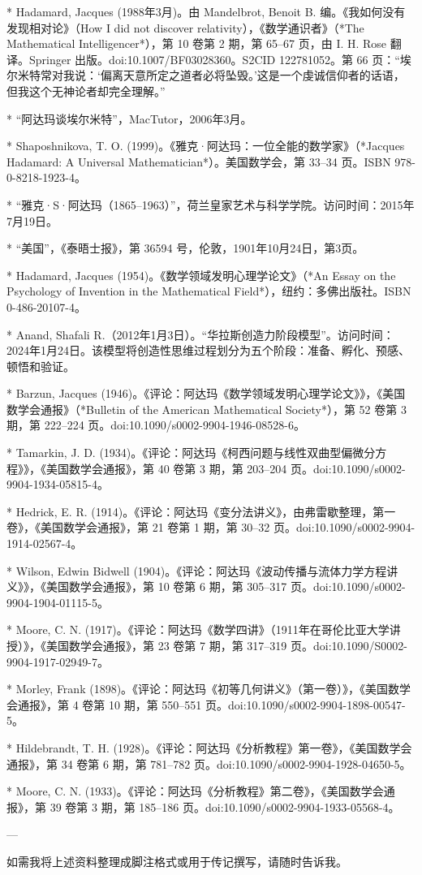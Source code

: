 * Hadamard, Jacques (1988年3月)。由 Mandelbrot, Benoit B. 编。《我如何没有发现相对论》（How I did not discover relativity），《数学通识者》（*The Mathematical Intelligencer*），第 10 卷第 2 期，第 65–67 页，由 I. H. Rose 翻译。Springer 出版。doi:10.1007/BF03028360。S2CID 122781052。第 66 页：“埃尔米特常对我说：‘偏离天意所定之道者必将坠毁。’这是一个虔诚信仰者的话语，但我这个无神论者却完全理解。”

* “阿达玛谈埃尔米特”，MacTutor，2006年3月。

* Shaposhnikova, T. O. (1999)。《雅克·阿达玛：一位全能的数学家》（*Jacques Hadamard: A Universal Mathematician*）。美国数学会，第 33–34 页。ISBN 978-0-8218-1923-4。

* “雅克·S·阿达玛（1865–1963）”，荷兰皇家艺术与科学学院。访问时间：2015年7月19日。

* “美国”，《泰晤士报》，第 36594 号，伦敦，1901年10月24日，第3页。

* Hadamard, Jacques (1954)。《数学领域发明心理学论文》（*An Essay on the Psychology of Invention in the Mathematical Field*），纽约：多佛出版社。ISBN 0-486-20107-4。

* Anand, Shafali R.（2012年1月3日）。“华拉斯创造力阶段模型”。访问时间：2024年1月24日。该模型将创造性思维过程划分为五个阶段：准备、孵化、预感、顿悟和验证。

* Barzun, Jacques (1946)。《评论：阿达玛《数学领域发明心理学论文》》，《美国数学会通报》（*Bulletin of the American Mathematical Society*），第 52 卷第 3 期，第 222–224 页。doi:10.1090/s0002-9904-1946-08528-6。

* Tamarkin, J. D. (1934)。《评论：阿达玛《柯西问题与线性双曲型偏微分方程》》，《美国数学会通报》，第 40 卷第 3 期，第 203–204 页。doi:10.1090/s0002-9904-1934-05815-4。

* Hedrick, E. R. (1914)。《评论：阿达玛《变分法讲义》，由弗雷歇整理，第一卷》，《美国数学会通报》，第 21 卷第 1 期，第 30–32 页。doi:10.1090/s0002-9904-1914-02567-4。

* Wilson, Edwin Bidwell (1904)。《评论：阿达玛《波动传播与流体力学方程讲义》》，《美国数学会通报》，第 10 卷第 6 期，第 305–317 页。doi:10.1090/s0002-9904-1904-01115-5。

* Moore, C. N. (1917)。《评论：阿达玛《数学四讲》（1911年在哥伦比亚大学讲授）》，《美国数学会通报》，第 23 卷第 7 期，第 317–319 页。doi:10.1090/S0002-9904-1917-02949-7。

* Morley, Frank (1898)。《评论：阿达玛《初等几何讲义》（第一卷）》，《美国数学会通报》，第 4 卷第 10 期，第 550–551 页。doi:10.1090/s0002-9904-1898-00547-5。

* Hildebrandt, T. H. (1928)。《评论：阿达玛《分析教程》第一卷》，《美国数学会通报》，第 34 卷第 6 期，第 781–782 页。doi:10.1090/s0002-9904-1928-04650-5。

* Moore, C. N. (1933)。《评论：阿达玛《分析教程》第二卷》，《美国数学会通报》，第 39 卷第 3 期，第 185–186 页。doi:10.1090/s0002-9904-1933-05568-4。

---

如需我将上述资料整理成脚注格式或用于传记撰写，请随时告诉我。
